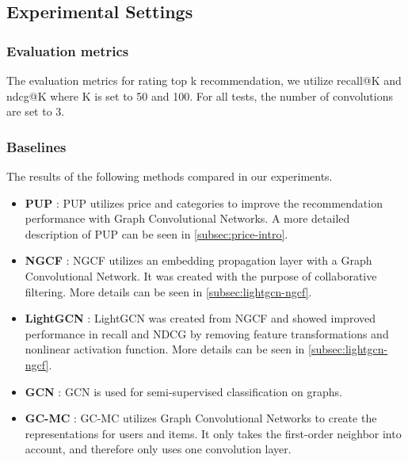 \subsection{Experimental Settings}
\subsubsection{Evaluation metrics}
The evaluation metrics for rating top k recommendation, we utilize recall@K and ndcg@K where K is set to 50 and 100.
For all tests, the number of convolutions are set to 3.

\subsubsection{Baselines}
The results of the following methods compared in our experiments.
\begin{itemize}
    \item \textbf{PUP} \cite{Priceaware}: PUP utilizes price and categories to improve the recommendation performance with Graph Convolutional Networks. A more detailed description of PUP can be seen in \autoref{subsec:price-intro}.
    \item \textbf{NGCF} \cite{NGCF_2019}: NGCF utilizes an embedding propagation layer with a Graph Convolutional Network. It was created with the purpose of collaborative filtering. More details can be seen in \autoref{subsec:lightgcn-ngcf}.
    \item \textbf{LightGCN} \cite{lightgcn}: LightGCN was created from NGCF and showed improved performance in recall and NDCG by removing feature transformations and nonlinear activation function. More details can be seen in \autoref{subsec:lightgcn-ngcf}.
    \item \textbf{GCN} \cite{kipf2017semisupervised}: GCN is used for semi-supervised classification on graphs.
    \item \textbf{GC-MC} \cite{berg2017graph}: GC-MC utilizes Graph Convolutional Networks to create the representations for users and items. It only takes the first-order neighbor into account, and therefore only uses one convolution layer.
\end{itemize}
